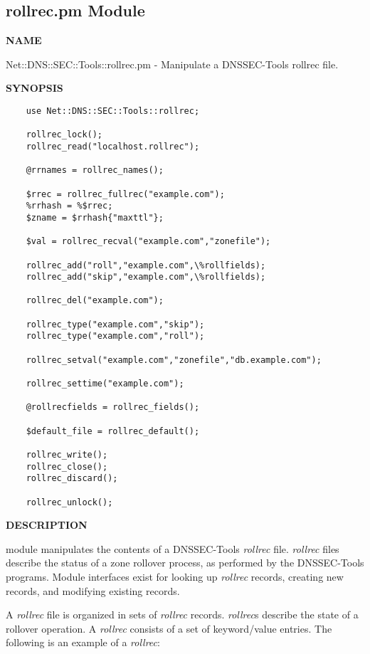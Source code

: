 \clearpage

\subsection{\bf rollrec.pm Module}

{\bf NAME}

\perlmod{}Net::DNS::SEC::Tools::rollrec.pm - Manipulate a DNSSEC-Tools rollrec file.

{\bf SYNOPSIS}

\begin{verbatim}
    use Net::DNS::SEC::Tools::rollrec;

    rollrec_lock();
    rollrec_read("localhost.rollrec");

    @rrnames = rollrec_names();

    $rrec = rollrec_fullrec("example.com");
    %rrhash = %$rrec;
    $zname = $rrhash{"maxttl"};

    $val = rollrec_recval("example.com","zonefile");

    rollrec_add("roll","example.com",\%rollfields);
    rollrec_add("skip","example.com",\%rollfields);

    rollrec_del("example.com");

    rollrec_type("example.com","skip");
    rollrec_type("example.com","roll");

    rollrec_setval("example.com","zonefile","db.example.com");

    rollrec_settime("example.com");

    @rollrecfields = rollrec_fields();

    $default_file = rollrec_default();

    rollrec_write();
    rollrec_close();
    rollrec_discard();

    rollrec_unlock();
\end{verbatim}

{\bf DESCRIPTION}

 module manipulates the contents of
a DNSSEC-Tools {\it rollrec} file.  {\it rollrec} files describe the status of
a zone rollover process, as performed by the DNSSEC-Tools programs.  Module
interfaces exist for looking up {\it rollrec} records, creating new records,
and modifying existing records.

A {\it rollrec} file is organized in sets of {\it rollrec} records.  {\it
rollrec}s describe the state of a rollover operation.  A {\it rollrec}
consists of a set of keyword/value entries.  The following is an example
of a {\it rollrec}:

